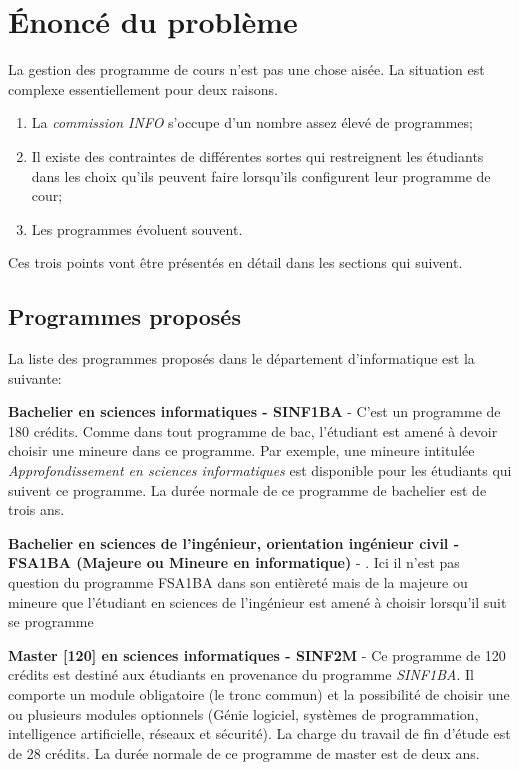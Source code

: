 \chapter{Énoncé du problème}
\label{ennonce}
La gestion des programme de cours n'est pas une chose aisée. La situation est complexe essentiellement pour deux raisons.
\begin{enumerate}
\item La \textit{commission INFO} s'occupe d'un nombre assez élevé de programmes;
\item Il existe des contraintes de différentes sortes qui restreignent les étudiants dans les choix qu'ils peuvent faire lorsqu'ils configurent leur programme de cour;
\item Les programmes évoluent souvent.
\end{enumerate}

Ces trois points vont être présentés en détail dans les sections qui suivent. 


\section{Programmes proposés}
La liste des programmes proposés dans le département d'informatique est la suivante:


\textbf{Bachelier en sciences informatiques - SINF1BA} \cite{SINF1BA} - C'est un programme de 180 crédits. Comme dans tout programme de bac, l'étudiant est amené à devoir choisir une mineure dans ce programme. Par exemple, une mineure intitulée \textit{Approfondissement en sciences informatiques} est disponible pour les étudiants qui suivent ce programme. La durée normale de ce programme de bachelier est de trois ans. 

\textbf{Bachelier en sciences de l'ingénieur, orientation ingénieur civil - FSA1BA (Majeure ou Mineure en informatique)} - \cite{FSA1BA}. Ici il n'est pas question du programme FSA1BA dans son entièreté mais de la majeure ou mineure que l'étudiant en sciences de l'ingénieur est amené à choisir lorsqu'il suit se programme

\textbf{Master [120] en sciences informatiques - SINF2M} \cite{SINF2M} - Ce programme de 120 crédits est destiné aux étudiants en provenance du programme \textit{SINF1BA}. Il comporte un module obligatoire (le tronc commun) et la possibilité de choisir une ou plusieurs modules optionnels (Génie logiciel, systèmes de programmation, intelligence artificielle, réseaux et sécurité). La charge du travail de fin d'étude est de 28 crédits. La durée normale de ce programme de master est de deux ans.

